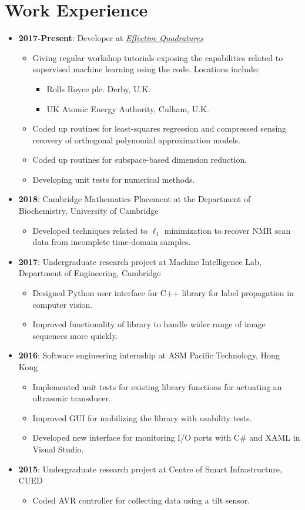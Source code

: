 \documentclass[letterpaper,11pt,oneside]{article}
\begin{document}
\section*{Work Experience}
\begin{itemize}
\item \textbf{2017-Present}: Developer at \href{https://www.effective-quadratures.org/}{\emph{Effective Quadratures}}
\begin{itemize}
\item Giving regular workshop tutorials exposing the capabilities related to supervised machine learning using the code. Locations include:
\begin{itemize}
\item Rolls Royce plc. Derby, U.K.
\item UK Atomic Energy Authority, Culham, U.K.
\end{itemize}
\item Coded up routines for least-squares regression and compressed sensing recovery of orthogonal polynomial approximation models.
\item Coded up routines for subspace-based dimension reduction.
\item Developing unit tests for numerical methods.
\end{itemize}
\item \textbf{2018}: Cambridge Mathematics Placement at the Department of Biochemistry, University of Cambridge
\begin{itemize}
\item Developed techniques related to $\ell_1$ minimization to recover NMR scan data from incomplete time-domain samples.
\end{itemize}
\item \textbf{2017}: Undergraduate research project at Machine Intelligence Lab, Department of Engineering, Cambridge
\begin{itemize}
\item Designed Python user interface for C++ library for label propagation in computer vision.
\item Improved functionality of library to handle wider range of image sequences more quickly.
\end{itemize}
\item \textbf{2016}: Software engineering internship at ASM Pacific Technology, Hong Kong
\begin{itemize}
\item Implemented unit tests for existing library functions for actuating an ultrasonic transducer.
\item Improved GUI for mobilizing the library with usability tests.
\item Developed new interface for monitoring I/O ports with C\# and XAML in Visual Studio.
\end{itemize}
\item \textbf{2015}: Undergraduate research project at Centre of Smart Infrastructure, CUED
\begin{itemize}
\item Coded AVR controller for collecting data using a tilt sensor.
\end{itemize}

\end{itemize}
\end{document}
